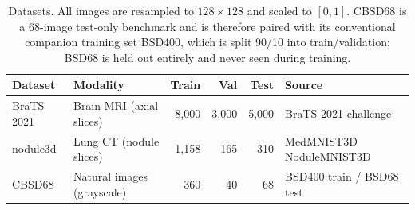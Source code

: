 \begin{table}[!t]
\centering
\caption{Datasets. All images are resampled to $128\times128$ and scaled to $[0,1]$. CBSD68 is a 68-image test-only benchmark and is therefore paired with its conventional companion training set BSD400, which is split 90/10 into train/validation; BSD68 is held out entirely and never seen during training.}
\label{tab:datasets}
\begin{tabular}{llrrrl}
\toprule
Dataset & Modality & Train & Val & Test & Source \\
\midrule
BraTS 2021 & Brain MRI (axial slices) & 8,000 & 3,000 & 5,000 & BraTS 2021 challenge \\
nodule3d & Lung CT (nodule slices) & 1,158 & 165 & 310 & MedMNIST3D NoduleMNIST3D \\
CBSD68 & Natural images (grayscale) & 360 & 40 & 68 & BSD400 train / BSD68 test \\
\bottomrule
\end{tabular}
\end{table}
